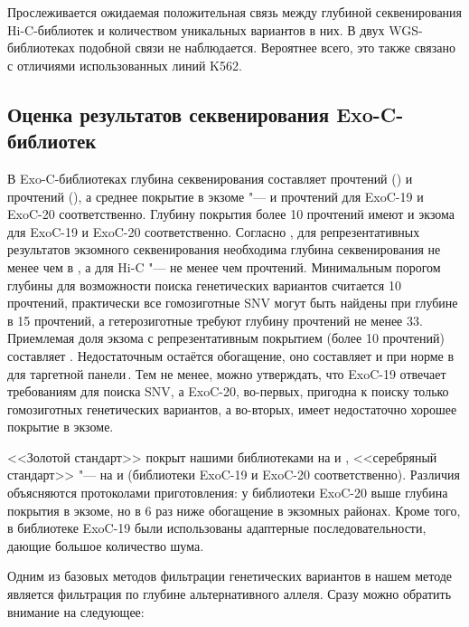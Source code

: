 \documentclass[a4paper,14pt]{extarticle}
\newcommand{\mln}{млн}
\newcommand{\ecitep}[1]{\textenglish{\citep{#1}}}
\begin{document}
Прослеживается ожидаемая положительная связь между глубиной секвенирования Hi-C\hyp{}библиотек и количеством уникальных вариантов в них.
В двух WGS\hyp{}библиотеках подобной связи не наблюдается.
Вероятнее всего, это также связано с отличиями использованных линий K562.

\subsection{Оценка результатов секвенирования Exo-C\hyp{}библиотек}

В Exo-C\hyp{}библиотеках глубина секвенирования составляет \numprint[\mln]{136.6} прочтений () и \numprint[\mln]{109.4} прочтений (), а среднее покрытие в экзоме "---  и  прочтений для ExoC-19 и ExoC-20 соответственно.
Глубину покрытия более 10 прочтений имеют  и  экзома для ExoC-19 и ExoC-20 соответственно.
Согласно \citet{Sims_2014}, для репрезентативных результатов экзомного секвенирования необходима глубина секвенирования не менее чем в , а для Hi-C "--- не менее чем \numprint[\mln]{100} прочтений.
Минимальным порогом глубины для возможности поиска генетических вариантов считается 10 прочтений, практически все гомозиготные SNV могут быть найдены при глубине в 15 прочтений, а гетерозиготные требуют глубину прочтений не менее 33.
Приемлемая доля экзома с репрезентативным покрытием (более 10 прочтений) составляет .
Недостаточным остаётся обогащение, оно составляет  и  при норме в  для  таргетной панели\,\ecitep{Roche_SeqCap}.
Тем не менее, можно утверждать, что ExoC-19 отвечает требованиям для поиска SNV, а ExoC-20, во-первых, пригодна к поиску только гомозиготных генетических вариантов, а во-вторых, имеет недостаточно хорошее покрытие в экзоме.

<<Золотой стандарт>> покрыт нашими библиотеками на  и , <<серебряный стандарт>> "--- на  и  (библиотеки ExoC-19 и ExoC-20 соответственно).
Различия объясняются протоколами приготовления: у библиотеки ExoC-20 выше глубина покрытия в экзоме, но в 6 раз ниже обогащение в экзомных районах.
Кроме того, в библиотеке ExoC-19 были использованы адаптерные последовательности, дающие большое количество шума.

Одним из базовых методов фильтрации генетических вариантов в нашем методе является фильтрация по глубине альтернативного аллеля.
Сразу можно обратить внимание на следующее:
\end{document}

